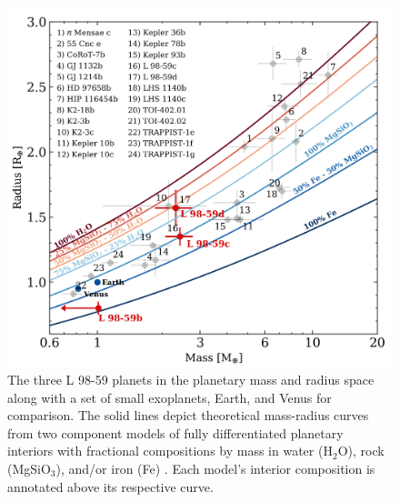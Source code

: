 \documentclass[longauth]{aa}
\begin{document}
\begin{figure}
    \centering
    \includegraphics[width=\hsize]{MRplot.png}
    \caption{The three L 98-59 planets in the planetary mass and radius space along with a set of small exoplanets, Earth, and Venus for comparison. The solid lines depict theoretical mass-radius curves from two component models of fully differentiated planetary interiors with fractional compositions by mass in water (H$_2$O), rock (MgSiO$_3$), and/or iron (Fe) \citep{zeng13}. Each model's interior composition is annotated above its respective curve.}
    \label{fig:MR}
\end{figure}
\end{document}
